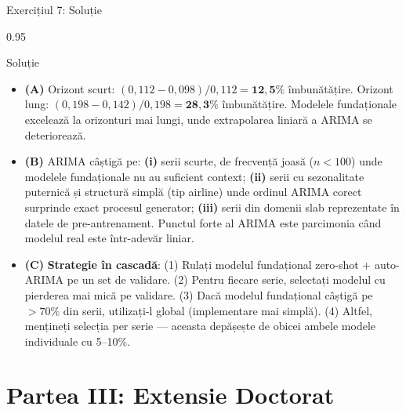 \documentclass[9pt, aspectratio=169, t]{beamer}
\begin{document}
\begin{frame}{Exercițiul 7: Soluție}
    \begin{cminipage}{0.95\textwidth}
    \begin{exampleblock}{Soluție}
        {\small
        \begin{itemize}\setlength{\itemsep}{3pt}
            \item \textcolor{MainBlue}{\textbf{(A)}} Orizont scurt: $(0{,}112 - 0{,}098)/0{,}112 = \mathbf{12{,}5\%}$ îmbunătățire. Orizont lung: $(0{,}198 - 0{,}142)/0{,}198 = \mathbf{28{,}3\%}$ îmbunătățire. Modelele fundaționale excelează la orizonturi mai lungi, unde extrapolarea liniară a ARIMA se deteriorează.
            \item \textcolor{MainBlue}{\textbf{(B)}} ARIMA câștigă pe: \textbf{(i)} serii scurte, de frecvență joasă ($n < 100$) unde modelele fundaționale nu au suficient context; \textbf{(ii)} serii cu sezonalitate puternică și structură simplă (tip airline) unde ordinul ARIMA corect surprinde exact procesul generator; \textbf{(iii)} serii din domenii slab reprezentate în datele de pre-antrenament. Punctul forte al ARIMA este parcimonia când modelul real este într-adevăr liniar.
            \item \textcolor{MainBlue}{\textbf{(C)}} \textbf{Strategie în cascadă}: (1) Rulați modelul fundațional zero-shot + auto-ARIMA pe un set de validare. (2) Pentru fiecare serie, selectați modelul cu pierderea mai mică pe validare. (3) Dacă modelul fundațional câștigă pe $> 70\%$ din serii, utilizați-l global (implementare mai simplă). (4) Altfel, mențineți selecția per serie --- aceasta depășește de obicei ambele modele individuale cu 5--10\%.
        \end{itemize}
        }
    \end{exampleblock}
    \end{cminipage}
\end{frame}

\section{Partea III: Extensie Doctorat}
\end{document}
